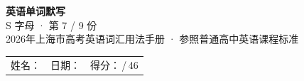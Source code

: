 \documentclass[10pt,a4paper]{article}
\begin{document}
\pagestyle{plain}

\begin{center}
{\LARGE\bfseries 英语单词默写}\\[0.22em]
{\large S 字母 · 第 7 / 9 份}\\[0.18em]
{\small 2026年上海市高考英语词汇用法手册 · 参照普通高中英语课程标准}
\end{center}

\vspace{0.25em}
\noindent\begin{tabular}{@{}p{}@{}p{}@{}p{}@{}}
姓名：\underline{\hspace{2.0cm}} & 日期：\underline{\hspace{2.0cm}} & 得分：\underline{\hspace{1.3cm}}\,/\,46 \\
\end{tabular}

\vspace{0.3em}

\vspace{0.08em}
\end{document}
